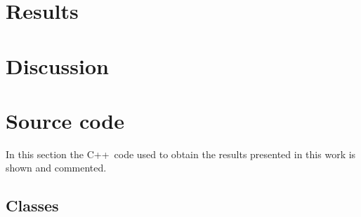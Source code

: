 \documentclass[a4paper,10pt,draft]{article}
\newcommand{\cpp}{C++}
\begin{document}
\section{Results}

\section{Discussion}


\newpage
\appendix

\section{Source code}
In this section the \cpp\ code used to obtain the results presented in this work is shown and commented.

\subsection{Classes}

\printbibliography[heading=bibintoc]
\end{document}
